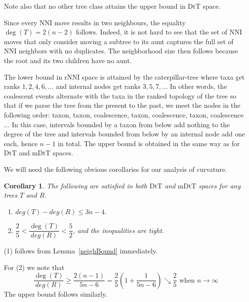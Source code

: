 \documentclass{amsart}
\newtheorem{corollary}[lemma]{Corollary}
\newcommand{\dts}{\mathrm{DtT}}
\newcommand{\rnni}{\mathrm{rNNI}}
\newcommand{\mdts}{\mathrm{mDtT}}
\begin{document}
Note also that no other tree class attains the upper bound in $\dts$ space.

Since every NNI move results in two neighbours, the equality $\deg(T) = 2(n-2)$ follows.
Indeed, it is not hard to see that the set of NNI moves that only consider moving a subtree to its aunt captures the full set of NNI neighbors with no duplicates.
The neighborhood size then follows because the root and its two children have no aunt.

The lower bound in $\rnni$ space is attained by the caterpillar-tree where taxa get ranks $1, 2, 4, 6, \ldots$ and internal nodes get ranks $3, 5, 7, \ldots$
In other words, the coalescent events alternate with the taxa in the ranked topology of the tree so that if we parse the tree from the present to the past, we meet the nodes in the following order: taxon, taxon, coalescence, taxon, coalescence, taxon, coalescence$\ldots$
In this case, intervals bounded by a taxon from below add nothing to the degree of the tree and intervals bounded from below by an internal node add one each, hence $n-1$ in total.
The upper bound is obtained in the same way as for $\dts$ and $\mdts$ spaces.
\endproof

We will need the following obvious corollaries for our analysis of curvature.

\begin{corollary}\label{degreeBounds}
The following are satisfied in both $\dts$ and $\mdts$ spaces for any trees $T$ and $R$.
\begin{enumerate}[(1)]
\item $deg(T)-deg(R) \leq 3n-4$.
\item $\dfrac25 < \dfrac{\deg(T)}{deg(R)} < \dfrac52$, and the inequalities are tight.
\end{enumerate}
\end{corollary}

\proof
(1) follows from Lemma~\ref{neighBound} immediately.

For (2) we note that
\[
\frac{\deg(T)}{deg(R)} \geq \frac{2(n-1)}{5n-6} = \frac25 (1 + \frac{1}{5n-6}) \searrow \frac 25 \mbox{ when } n\to\infty
\]
The upper bound follows similarly.
\endproof
\end{document}
